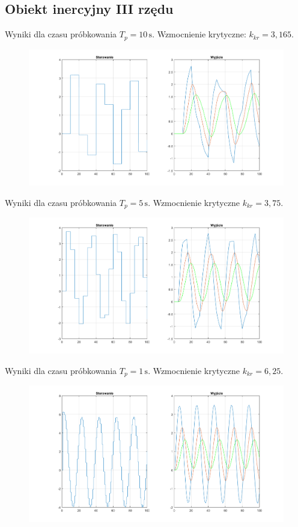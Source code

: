 \documentclass[a4paper, 12pt]{article}
\begin{document}
		\subsection{Obiekt inercyjny III rzędu}
			Wyniki dla czasu próbkowania $T_p = 10 \, \mathrm{s}$. Wzmocnienie krytyczne: $k_{kr} = 3,165$.
			\begin{figure}[H]
				\centering
				\includegraphics[width = \textwidth]{./img/trzy_k_3_165.png}
			\end{figure}
			\newpage
			\noindent Wyniki dla czasu próbkowania $T_p = 5 \, \mathrm{s}$. Wzmocnienie krytyczne $k_{kr} = 3,75$.
			\begin{figure}[H]
				\centering
				\includegraphics[width = \textwidth]{./img/trzy_k_3_75.png}
			\end{figure}
			\noindent Wyniki dla czasu próbkowania $T_p = 1 \, \mathrm{s}$. Wzmocnienie krytyczne $k_{kr} = 6,25$.
			\begin{figure}[H]
				\centering
				\includegraphics[width = \textwidth]{./img/trzy_k_6_25.png}
			\end{figure}
\end{document}

